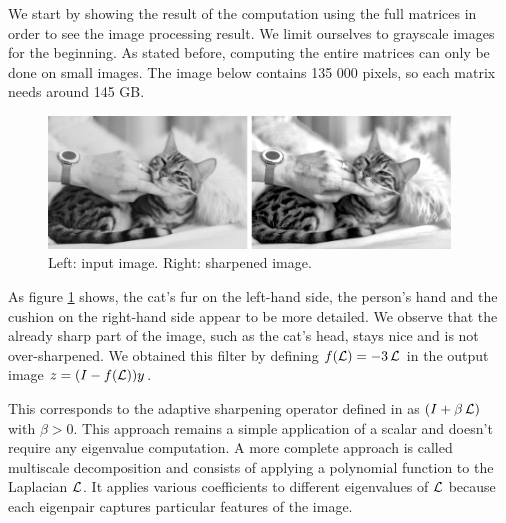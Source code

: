We start by showing the result of the computation using the full matrices in order to see the image processing result.
We limit ourselves to grayscale images for the beginning.
As stated before, computing the entire matrices can only be done on small images.
The image below contains 135 000 pixels, so each matrix needs around 145 GB.

\begin{figure}[H]
 \centering
 \includegraphics[width=0.95\textwidth]{img/cat.png}
 \caption{Left: input image. Right: sharpened image.}
 \label{fig:entire_result}
\end{figure}

As figure \ref{fig:entire_result} shows, the cat's fur on the left-hand side, the person's hand and the cushion on the right-hand side appear to be more detailed.
We observe that the already sharp part of the image, such as the cat's head, stays nice and is not over-sharpened.
We obtained this filter by defining \(f(\operatorname{\mathcal{L}}) = -3\operatorname{\mathcal{L}}\) in the output image \(z = (I - f(\operatorname{\mathcal{L}}))y\).

This corresponds to the adaptive sharpening operator defined in \cite{siam_slides_2016} as \((I + \beta \operatorname{\mathcal{L}})\) with \(\beta > 0\).
This approach remains a simple application of a scalar and doesn't require any eigenvalue computation.
A more complete approach is called multiscale decomposition \cite{talebi_nonlocal_2014} and consists of applying a polynomial function to the Laplacian \(\operatorname{\mathcal{L}}\).
It applies various coefficients to different eigenvalues of \(\operatorname{\mathcal{L}}\) because each eigenpair captures particular features of the image.

